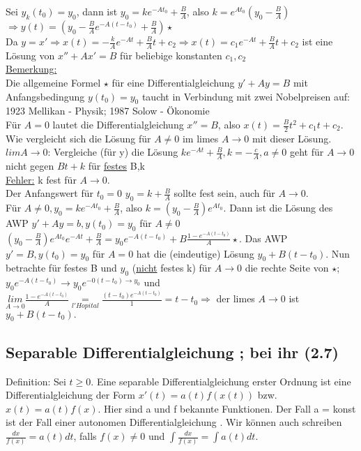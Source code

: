 \documentclass[12pt,a4paper]{article}
\newcommand{\DGL}{Differentialgleichung }
\begin{document}
Sei $y_k(t_0) = y_0$, dann ist $y_0 = ke^{-At_0} + \frac{B}{A}$, also $k=e^{At_0}(y_0-\frac{B}{A})$ \\
$\Rightarrow y(t) = (y_0 - \frac{B}{A}e^{-A(t-t_0)} + \frac{B}{A}) \star$ \\
Da $y=x' \Rightarrow x(t) = -\frac{k}{A} e^{-At} + \frac{B}{A} t + c_2 \Rightarrow x(t) = c_1 e^{-At} + \frac{B}{A} t + c_2$ ist eine Lösung von $x''+Ax'=B$ für beliebige konstanten $c_1, c_2$ \\
\underline{Bemerkung:} \\
Die allgemeine Formel $\star$ für eine \DGL $y'+Ay=B$ mit Anfangsbedingung $y(t_0) = y_0$ taucht in Verbindung mit zwei Nobelpreisen auf: 1923 Mellikan - Physik; 1987 Solow - Ökonomie \\
Für $A=0$ lautet die \DGL $x''= B$, also $x(t) = \frac{B}{2}t^2 + c_1 t + c_2$. \\
Wie vergleicht sich die Lösung für $A \neq 0$ im limes $A \rightarrow 0$ mit dieser Lösung. \\
\underline{$lim A \rightarrow 0$}: Vergleiche (für y) die Lösung $ke^{-At} + \frac{B}{A}, k = -\frac{c}{A}, a \neq 0$ geht für $A \rightarrow 0$ nicht gegen $Bt+k$ für \underline{festes} B,k \\
\underline{Fehler:} k fest für $A \rightarrow 0$. \\
Der Anfangswert für $t_0 = 0$ $y_0 = k + \frac{B}{A}$ sollte fest sein, auch für $A \rightarrow 0$. \\
Für $A \neq 0, y_0 = ke^{-At_0} + \frac{B}{A}$, also $k = (y_0 - \frac{B}{A}) e^{At_0}$. Dann ist die Lösung des AWP $y'+Ay=b, y(t_0)=y_0$ für $A \neq 0$ $(y_0-\frac{B}{A})e^{At_0}e^{-At} + \frac{B}{A} = y_0 e^{-A(t-t_0)} + B \frac{1-e^{-A(t-t_0)}}{A} \star$. Das AWP $y'=B, y(t_0) = y_0$ für $A = 0$ hat die (eindeutige) Lösung $y_0 + B(t-t_0)$. Nun betrachte für festes B und $y_0$ (\underline{nicht} festes k) für $A \rightarrow 0$ die rechte Seite von $\star$; $y_0e^{-A(t-t_0)} \rightarrow y_0e^{-0(t-t_0) \rightarrow y_0}$ und $\underset{A \rightarrow 0}{lim} \frac{1-e^{-A(t-t_0)}}{A} \underset{l'Hopital}{=} \frac{(t-t_0)e^{-A(t-t_0)}}{1} = t-t_0 \Rightarrow$ der limes $A \rightarrow 0$ ist $y_0+B(t-t_0).$
\subsection{Separable \DGL; bei ihr (2.7)}
Definition: Sei $t\geq0$. Eine separable \DGL erster Ordnung ist eine \DGL der Form $x'(t) = a(t)f(x(t))$ bzw. $x(t)=a(t)f(x)$. Hier sind a und f bekannte Funktionen. Der Fall a = konst ist der Fall einer autonomen \DGL. Wir können auch schreiben $\frac{dx}{f(x)} = a(t)dt$, falls $f(x) \neq 0$ und $\int \frac{dx}{f(x)} = \int a(t)dt$.
\end{document}
